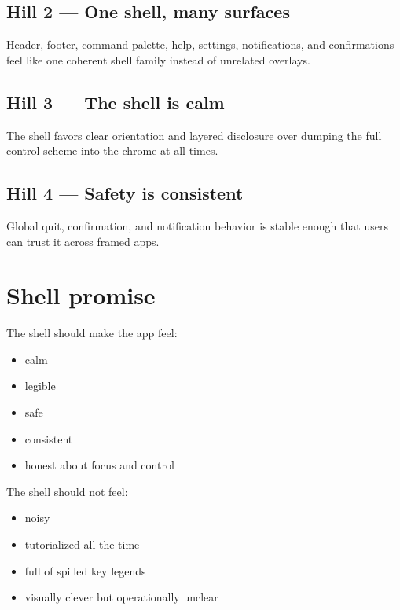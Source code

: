 \subsection{Hill 2 --- One shell, many surfaces}\label{record-047-hill-2-one-shell-many-surfaces}

Header, footer, command palette, help, settings, notifications, and confirmations feel like one coherent shell family instead of unrelated overlays.

\subsection{Hill 3 --- The shell is calm}\label{record-047-hill-3-the-shell-is-calm}

The shell favors clear orientation and layered disclosure over dumping the full control scheme into the chrome at all times.

\subsection{Hill 4 --- Safety is consistent}\label{record-047-hill-4-safety-is-consistent}

Global quit, confirmation, and notification behavior is stable enough that users can trust it across framed apps.

\section{Shell promise}\label{record-047-shell-promise}

The shell should make the app feel:

\begin{itemize}
\tightlist
\item
  calm
\item
  legible
\item
  safe
\item
  consistent
\item
  honest about focus and control
\end{itemize}

The shell should not feel:

\begin{itemize}
\tightlist
\item
  noisy
\item
  tutorialized all the time
\item
  full of spilled key legends
\item
  visually clever but operationally unclear
\end{itemize}

